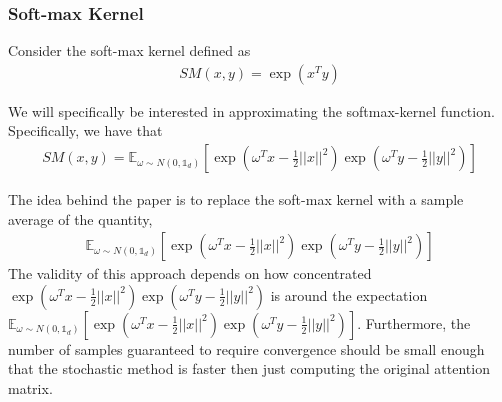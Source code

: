 \documentclass[showpacs,onecolumn,aps,floatfix,superscriptaddress,noshowpacs]{revtex4}
\begin{document}
\subsubsection{Soft-max Kernel}
Consider the soft-max kernel defined as
\begin{align*}
SM(x,y) = \exp( x^{T} y )
\end{align*}

We will specifically be interested in approximating the softmax-kernel function. Specifically, we have that
\begin{align*}
SM(x,y) = \mathbb{E}_{\omega \sim N(0, \mathbb{1}_{d} )}[ \exp( \omega^{T}x - \frac{1}{2}||x||^{2} ) \exp( \omega^{T}y - \frac{1}{2}||y||^{2} )  ]
\end{align*}

The idea behind the paper \cite{Choromanski_2020} is to replace the soft-max kernel with a sample average of the quantity,
\begin{align*}
\mathbb{E}_{\omega \sim N(0, \mathbb{1}_{d} )}[ \exp( \omega^{T}x - \frac{1}{2}||x||^{2} ) \exp( \omega^{T}y - \frac{1}{2}||y||^{2} )  ]
\end{align*}
The validity of this approach depends on how concentrated $\exp( \omega^{T}x - \frac{1}{2}||x||^{2} ) \exp( \omega^{T}y - \frac{1}{2}||y||^{2} ) $ is around the expectation $\mathbb{E}_{\omega \sim N(0, \mathbb{1}_{d} )}[ \exp( \omega^{T}x - \frac{1}{2}||x||^{2} ) \exp( \omega^{T}y - \frac{1}{2}||y||^{2} )  ]$. Furthermore, the number of samples guaranteed to require convergence should be small enough that the stochastic method is faster then just computing the original attention matrix.


 
 
\end{document}
